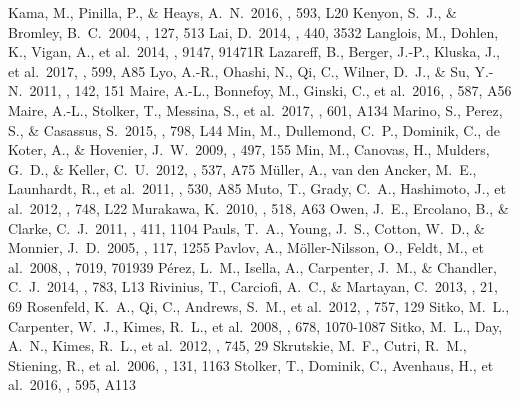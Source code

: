 \documentclass[twocolumn,tighten]{aastex61}
\begin{document}
\begin{thebibliography}{}
 Kama, M., Pinilla, P., \& Heays, A.~N.\ 2016, \aap, 593, L20
 Kenyon, S.~J., \& Bromley, B.~C.\ 2004, \aj, 127, 513
 Lai, D.\ 2014, \mnras, 440, 3532
 Langlois, M., Dohlen, K., Vigan, A., et al.\ 2014, \procspie, 9147, 91471R
 Lazareff, B., Berger, J.-P., Kluska, J., et al.\ 2017, \aap, 599, A85
 Lyo, A.-R., Ohashi, N., Qi, C., Wilner, D.~J., \& Su, Y.-N.\ 2011, \aj, 142, 151
 Maire, A.-L., Bonnefoy, M., Ginski, C., et al.\ 2016, \aap, 587, A56 
 Maire, A.-L., Stolker, T., Messina, S., et al.\ 2017, \aap, 601, A134
 Marino, S., Perez, S., \& Casassus, S.\ 2015, \apjl, 798, L44
 Min, M., Dullemond, C.~P., Dominik, C., de Koter, A., \& Hovenier, J.~W.\ 2009, \aap, 497, 155
 Min, M., Canovas, H., Mulders, G.~D., \& Keller, C.~U.\ 2012, \aap, 537, A75
 M{\"u}ller, A., van den Ancker, M.~E., Launhardt, R., et al.\ 2011, \aap, 530, A85
 Muto, T., Grady, C.~A., Hashimoto, J., et al.\ 2012, \apjl, 748, L22
 Murakawa, K.\ 2010, \aap, 518, A63
 Owen, J.~E., Ercolano, B., \& Clarke, C.~J.\ 2011, \mnras, 411, 1104
 Pauls, T.~A., Young, J.~S., Cotton, W.~D., \& Monnier, J.~D.\ 2005, \pasp, 117, 1255
 Pavlov, A., M{\"o}ller-Nilsson, O., Feldt, M., et al.\ 2008, \procspie, 7019, 701939
 P{\'e}rez, L.~M., Isella, A., Carpenter, J.~M., \& Chandler, C.~J.\ 2014, \apjl, 783, L13
 Rivinius, T., Carciofi, A.~C., \& Martayan, C.\ 2013, \aapr, 21, 69
 Rosenfeld, K.~A., Qi, C., Andrews, S.~M., et al.\ 2012, \apj, 757, 129
 Sitko, M.~L., Carpenter, W.~J., Kimes, R.~L., et al.\ 2008, \apj, 678, 1070-1087
 Sitko, M.~L., Day, A.~N., Kimes, R.~L., et al.\ 2012, \apj, 745, 29
 Skrutskie, M.~F., Cutri, R.~M., Stiening, R., et al.\ 2006, \aj, 131, 1163
 Stolker, T., Dominik, C., Avenhaus, H., et al.\ 2016, \aap, 595, A113

\end{thebibliography}
\end{document}
